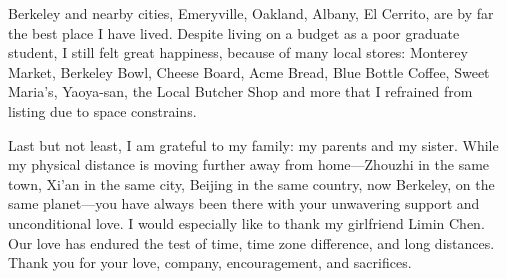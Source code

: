 \documentclass[thesis.tex]{subfiles}
\begin{document}
\begin{acknowledgements}
  Berkeley and nearby cities, Emeryville, Oakland, Albany, El Cerrito, are by
  far the best place I have lived. Despite living on a budget as a poor graduate
  student, I still felt great happiness, because of many local stores: Monterey
  Market, Berkeley Bowl, Cheese Board, Acme Bread, Blue Bottle Coffee, Sweet
  Maria's, Yaoya-san, the Local Butcher Shop and more that I refrained from
  listing due to space constrains.

  Last but not least, I am grateful to my family: my parents and my
  sister. While my physical distance is moving further away from home---Zhouzhi
  in the same town, Xi'an in the same city, Beijing in the same country, now
  Berkeley, on the same planet---you have always been there with your unwavering
  support and unconditional love. I would especially like to thank my girlfriend
  Limin Chen. Our love has endured the test of time, time zone difference, and
  long distances. Thank you for your love, company, encouragement, and
  sacrifices.

\end{acknowledgements}
\end{document}
